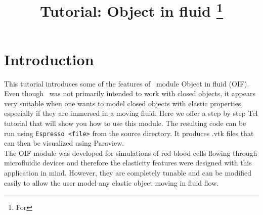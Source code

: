 \documentclass[
a4paper,                        %
11pt,                           %
twoside,                        %
footsepline,                    %
headsepline,                    %
headexclude,                    %
footexclude,                    %
pagesize,                       %
]{scrartcl}
\begin{document}
\esptitlehead
\title{Tutorial: Object in fluid
\ifdefined\esversion
\thanks{For \es \esversion}
\fi
}

\maketitle
\tableofcontents

\section{Introduction}

This tutorial introduces some of the features of \es\ module Object in fluid (OIF). Even though \es\ was not primarily intended to work with closed objects, it appears very suitable when one wants to model closed objects with elastic properties, especially if they are immersed in a moving fluid. Here we offer a step by step Tcl tutorial that will show you how to use this module. The resulting code can be run using \verb|Espresso <file>| from the \es source directory. It produces .vtk files that can then be visualized using Paraview.\\

The OIF module was developed for simulations of red blood cells flowing through microfluidic devices and therefore the elasticity features were designed with this application in mind. However, they are completely tunable and can be modified easily to allow the user model any elastic object moving in fluid flow.  
\end{document}
